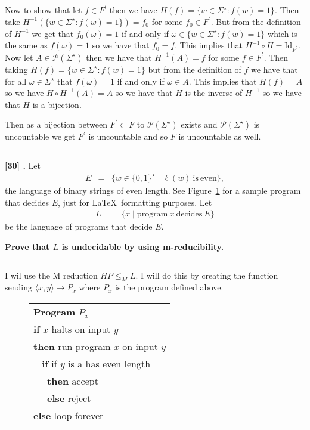 \documentclass[11pt,twoside]{article}
\newcounter{problem}
\newcommand{\problem}[1]{%
\refstepcounter{problem}\noindent\textbf{[#1] \arabic{problem}.}}
\newcommand{\solution}{\bigskip\hrule\bigskip}
\newcommand{\problembreak}{\bigskip\hrule\bigskip}
\begin{document}
Now to show that let $f\in F^\prime$ then we have $H(f)=\{w\in \Sigma^\star: f(w)=1\}$. Then take $H^{-1}(\{w\in \Sigma^\star: f(w)=1\})=f_0$ for some $f_0\in F^\prime$. But from the definition of $H^{-1}$ we get that $f_0(\omega)=1$ if and only if $\omega \in \{w\in \Sigma^\star: f(w)=1\}$ which is the same as $f(\omega)=1$ so we have that $f_0=f$. This implies that $H^{-1}\circ H=\text{Id}_{F^\prime}$. Now let $A\in \mathcal P(\Sigma^\star)$ then we have that $H^{-1}(A)=f$ for some $f\in F^\prime$. Then taking $H(f)=\{w\in \Sigma ^\star: f(w)=1\}$ but from the definition of $f$ we have that for all $\omega \in \Sigma^\star$ that $f(\omega)=1$ if and only if $\omega \in A$. This implies that $H(f)=A$ so we have $H\circ H^{-1}(A)=A$ so we have that $H$ is the inverse of $H^{-1}$ so we have that $H$ is a bijection. 

Then as a bijection between $F^\prime\subset F$ to $\mathcal{P}(\Sigma^\star)$ exists and $\mathcal{P}(\Sigma^\star)$ is uncountable we get $F^\prime$ is uncountable and so $F$ is uncountable as well.



\problembreak

\problem{30}
Let
\begin{eqnarray*}
E
& = &
\{w\in\{0,1\}^\star\mid \ell(w) \mathrm{\ is\ even}\},
\end{eqnarray*}
the language of binary strings of even length.
See Figure~\ref{figure:sampleprogram}
for a sample program that decides $E$,
just for \LaTeX\ formatting purposes.
Let
\begin{eqnarray*}
L
& = &
\{x\mid \mathrm{program\ } x \mathrm{\ decides\ } E\}
\end{eqnarray*}
be the language of programs that decide $E$.

{\bfseries
Prove that $L$ is undecidable by using m-reducibility.
}

\solution

I wil use the M reduction $HP\leq_M L$. I will do this by creating the function sending $\langle x, y\rangle  \to P_x$ where $P_x$ is the program defined above.

\begin{figure}[tp]
    \begin{tabular}{|l|}
    \hline
    \textbf{Program} $P_x$ \\
    \textbf{if} $x$ halts on input $y$ \\
    \textbf{    then} run program $x$ on input $y$ \\
    $\;\;$ \textbf{       if} if $y$ is a has even length
     \\
    $\;\;\;\;$ \textbf{       then} accept \\
     $\;\;\;\;$ \textbf{       else} reject \\
    \textbf{else} loop forever \\
    \hline
    \end{tabular}
    \label{figure:sampleprogram}
\end{figure}
\end{document}
